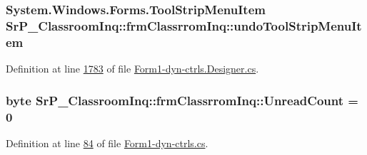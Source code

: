 \hypertarget{class_sr_p___classroom_inq_1_1frm_classrrom_inq_a8163a2e440678bc9508520209879805e}{
\subsubsection[{undo\-Tool\-Strip\-Menu\-Item}]{\setlength{\rightskip}{0pt plus 5cm}\-System.\-Windows.\-Forms.\-Tool\-Strip\-Menu\-Item {\bf \-Sr\-P\-\_\-\-Classroom\-Inq\-::frm\-Classrrom\-Inq\-::undo\-Tool\-Strip\-Menu\-Item}}}
\label{class_sr_p___classroom_inq_1_1frm_classrrom_inq_a8163a2e440678bc9508520209879805e}


\-Definition at line \hyperlink{_form1-dyn-ctrls_8_designer_8cs_source_l01783}{1783} of file \hyperlink{_form1-dyn-ctrls_8_designer_8cs_source}{\-Form1-\/dyn-\/ctrls.\-Designer.\-cs}.

\hypertarget{class_sr_p___classroom_inq_1_1frm_classrrom_inq_a9978aff45fb1057f102e224f8485f096}{
\subsubsection[{\-Unread\-Count}]{\setlength{\rightskip}{0pt plus 5cm}byte {\bf \-Sr\-P\-\_\-\-Classroom\-Inq\-::frm\-Classrrom\-Inq\-::\-Unread\-Count} = 0}}
\label{class_sr_p___classroom_inq_1_1frm_classrrom_inq_a9978aff45fb1057f102e224f8485f096}


\-Definition at line \hyperlink{_form1-dyn-ctrls_8cs_source_l00084}{84} of file \hyperlink{_form1-dyn-ctrls_8cs_source}{\-Form1-\/dyn-\/ctrls.\-cs}.

